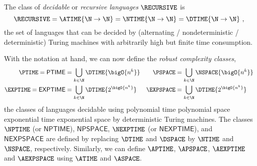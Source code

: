 \documentclass[../../diss.tex]{subfiles}
\begin{document}
\begin{example}
    The class of \emph{decidable} or \emph{recursive languages} $\RECURSIVE$ is
    \[
        \RECURSIVE = \ATIME{\N \to \N} = \NTIME{\N \to \N} = \DTIME{\N \to \N}
        \ ,
    \]
    the set of languages that can be decided by (alternating / nondeterministic / deterministic) Turing machines with arbitrarily high but finite time consumption.
\end{example}

With the notation at hand, we can now define the \emph{robust complexity classes},
    \begin{align*}
        \PTIME = \mathsf{PTIME} &= \bigcup_{k \in \N} \DTIME{\bigO{n^k}}
        &
        \PSPACE &= \bigcup_{k \in \N} \NSPACE{\bigO{n^k}}
        \\
        \EXPTIME = \mathsf{EXPTIME} &= \bigcup_{k \in \N} \DTIME{2^{\bigO{n^k}}}
        &
        \EXPSPACE &= \bigcup_{k \in \N} \DTIME{2^{\bigO{n^k}}}
    \end{align*}
the classes of languages decidable using polynomial time \resp polynomial space \resp exponential time \resp exponential space by deterministic Turing machines.
The classes $\NPTIME$ (or $\mathsf{NPTIME}$), $\mathsf{NPSPACE}$, $\NEXPTIME$ (or $\mathsf{NEXPTIME}$), and $\mathsf{NEXPSPACE}$ are defined by replacing $\DTIME$ and $\DSPACE$ by $\NTIME$ and $\NSPACE$, respectively.
Similarly, we can define $\APTIME$, $\APSPACE$, $\AEXPTIME$ and $\AEXPSPACE$ using $\ATIME$ and $\ASPACE$.
\end{document}
